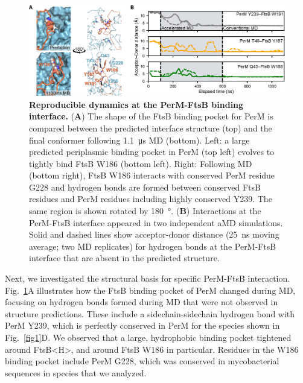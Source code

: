 \documentclass[pdflatex,sn-nature]{sn-jnl}%
\def\textsuperscript#1{<#1>}%
\newcommand\ftsbH{FtsB\textsuperscript{H}}
\begin{document}
\begin{figure}[t]
    \centering
    \includegraphics[width=1.0\textwidth]{./fig2.eps}
    \caption{
        \textbf{Reproducible dynamics at the PerM-FtsB binding interface.}
        (\textbf{A}) The shape of the FtsB binding pocket for PerM is compared between the predicted interface structure (top) and the final conformer following \qty{1.1}{\us} MD (bottom). Left: a large predicted periplasmic binding pocket in PerM (top left) evolves to tightly bind FtsB W186 (bottom left). Right: Following MD (bottom right), FtsB W186 interacts with conserved PerM residue G228 and hydrogen bonds are formed between conserved FtsB residues and PerM residues including highly conserved Y239. The same region is shown rotated by \qty{180}{\degree}.
        (\textbf{B}) Interactions at the PerM-FtsB interface appeared in two independent aMD simulations. Solid and dashed lines show acceptor-donor distance (\qty{25}{\ns} moving average; two MD replicates) for hydrogen bonds at the PerM-FtsB interface that are absent in the predicted structure.
    }\label{fig2}
\end{figure}

Next, we investigated the structural basis for specific PerM-FtsB interaction.
Fig.~\ref{fig2}A illustrates how the FtsB binding pocket of PerM changed during MD, focusing on hydrogen bonds formed during MD that were not observed in structure predictions.
These include a sidechain-sidechain hydrogen bond with PerM Y239, which is perfectly conserved in PerM for the species shown in Fig.~\ref{fig1}D.
We observed that a large, hydrophobic binding pocket tightened around \ftsbH{}, and around FtsB W186 in particular.
Residues in the W186 binding pocket include PerM G228, which was conserved in mycobacterial sequences in species that we analyzed.
\end{document}
